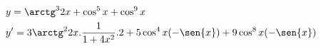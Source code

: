 \begin{ex}
\begin{align}
&y=\arctg^3{2x}+\cos^5{x}+\cos^9{x}\nonumber\\
&y'=3\arctg^2{2x}.\frac{1}{1+4x^2}.2+5\cos^4{x}(-\sen{x})+9\cos^8{x}(-\sen{x})\nonumber
\end{align}
\end{ex}